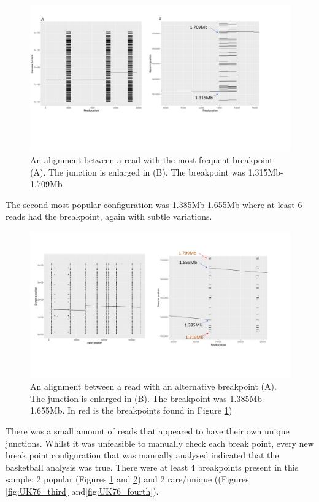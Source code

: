 \documentclass{article}
\begin{document}
\begin{figure}[h!]
\centering
\includegraphics[width=\textwidth{}]{Chapter_2/Popular breakpoint.jpg}
\caption{An alignment between a read with the most frequent breakpoint (A). The junction is enlarged in (B). The breakpoint was 1.315Mb-1.709Mb}
\label{fig:UK76_most_popular}
\end{figure}

The second most popular configuration was  1.385Mb-1.655Mb where at least 6 reads had the breakpoint, again with subtle variations.


\begin{figure}[h!]
\centering
\includegraphics[width=\textwidth{}]{Chapter_2/second most pop.jpg}
\caption{An alignment between a read with an alternative breakpoint (A). The junction is enlarged in (B). The breakpoint was 1.385Mb-1.655Mb. In red is the breakpoints found in Figure \ref{fig:UK76_most_popular})}
\label{fig:UK76_second_popular}
\end{figure}

There was a small amount of reads that appeared to have their own unique junctions. Whilst it was unfeasible to manually check each break point, every new break point configuration that was manually analysed indicated that the basketball analysis was true. There were at least 4 breakpoints present in this sample: 2 popular (Figures \ref{fig:UK76_most_popular} and \ref{fig:UK76_second_popular}) and 2 rare/unique ((Figures \ref{fig:UK76_third} and\ref{fig:UK76_fourth}).
\end{document}
